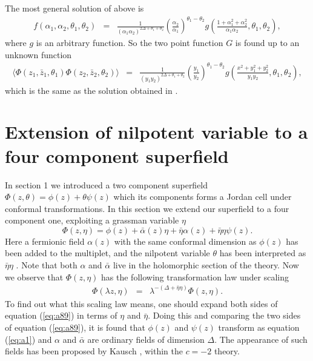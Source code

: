 \documentclass[a4paper,11pt]{article}
\begin{document}
The most general solution of above is
\begin{eqnarray}\label{eq:a76}
f(\alpha_{1},\alpha_{2},\theta_{1},\theta_{2})&=&\frac{1}{(\alpha_{1}\alpha_{2})^
{2\Delta+\theta_{1}+\theta_{2}}}
\left(\frac{\alpha_{2}}{\alpha_{1}}\right)^{\theta_{1}-\theta_{2}}
g\left(\frac{1+\alpha_{1}^{2}+\alpha_{2}^{2}}{\alpha_{1}
\alpha_{2}},\theta_{1},\theta_{2}\right),
\end{eqnarray}
where $g$ is an arbitrary function. So the two point function $G$
is found up to an unknown function
\begin{eqnarray}\label{eq:a77}
\langle \Phi(z_{1},\bar{z}_{1},\theta_{1})\Phi(z_{2},\bar{z}_{2},
\theta_{2})\rangle&=&
\frac{1}{(y_{1}y_{2})^{2\Delta+\theta_{1}+\theta_{2}}}
\left(\frac{y_{1}}{y_{2}}\right)^{\theta_{1}-\theta_{2}}
g\left(\frac{x^{2}+y_{1}^{2}+y_{2}^{2}}{y_{1}y_{2}},\theta_{1},\theta_{2}\right),
\end{eqnarray}
which is the same as the solution obtained in \cite{MR}.
\section{Extension of nilpotent variable to a four component superfield}
In section 1 we introduced a two component superfield $
\Phi(z,\theta)=\phi(z)+\theta\psi(z)$ which its components forms
a Jordan cell under conformal transformations. In this section we
extend our superfield to a four component one, exploiting a
grassman variable $\eta$
\begin{equation}\label{eq:a88}
\Phi(z,\eta)= \phi(z) + \bar{\alpha}(z) \eta +\bar{\eta}
\alpha(z) + \bar{\eta} \eta\psi(z).
\end{equation}
Here a fermionic field $\alpha(z)$ with the same conformal
dimension as $\phi(z)$ has been added to the multiplet, and the
nilpotent variable $\theta$ has been interpreted as
$\bar{\eta}\eta$ . Note that both $\alpha$ and $\bar{\alpha}$
live in the holomorphic section of the theory. Now we observe
that $ \Phi (z,\eta )$ has the following transformation law under
scaling
\begin{eqnarray}\label{eq:a89}
\Phi(\lambda z,\eta)&=&\lambda^{-(\Delta+\bar{\eta}\eta)}
\Phi(z,\eta) .
\end{eqnarray}
To find out what this scaling law means, one should expand both
sides of equation (\ref{eq:a89}) in terms of $\eta$ and
$\bar{\eta}$. Doing this and comparing the two sides of equation
(\ref{eq:a89}), it is found that $\phi(z)$ and $\psi(z)$
transform as equation (\ref{eq:a1}) and $\alpha$ and
$\bar{\alpha}$ are ordinary fields of dimension $\Delta$. The
appearance of such fields has been proposed by Kausch
\cite{kausch}, within the $c=-2$ theory.
\end{document}
